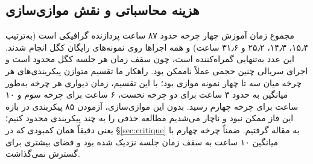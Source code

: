 \subsection{هزینه محاسباتی و نقش موازی‌سازی}
مجموع زمان آموزش چهار چرخه حدود \num{۸۷} ساعت پردازنده گرافیکی است (به‌ترتیب \num{۱۵٫۴}، \num{۱۴٫۳}، \num{۲۵٫۲} و \num{۳۱٫۶} ساعت) و همه اجرا‌ها روی نمونه‌های رایگان کگل انجام شدند. این عدد به‌تنهایی گمراه‌کننده است، چون سقف زمان هر جلسه کگل محدود است و اجرای سریالی چنین حجمی عملاً ناممکن بود. راهکار ما تقسیم متوازن پیکربندی‌های هر چرخه میان سه تا چهار نمونه موازی بود؛ با این تقسیم، زمان دیواری هر چرخه به‌طور میانگین به حدود ۳ ساعت برای دو چرخه نخست، ۶ ساعت برای چرخه سوم و ۱۰ ساعت برای چرخه چهارم رسید. بدون این موازی‌سازی، آزمودن ۸۵ پیکربندی در بازه این فاز ممکن نبود و ناچار می‌شدیم مطالعه حذفی را به چند پیکربندی محدود کنیم؛ یعنی دقیقاً همان کمبودی که در \S\ref{sec:critique} به مقاله گرفتیم. ضمناً چرخه چهارم با میانگین ۱۰ ساعت به سقف زمان جلسه نزدیک شده بود و فضای بیشتری برای گسترش نمی‌گذاشت.
